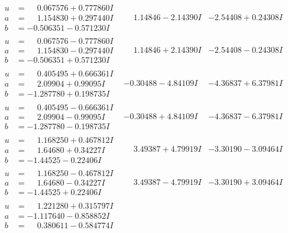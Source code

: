 \documentclass[1p]{elsarticle_modified}
\theoremstyle{definition}
\begin{document}
$$\begin{array}{c|c|c}
\begin{aligned}
u &= \phantom{-}0.067576 + 0.777860 I \\
a &= \phantom{-}1.154830 + 0.297440 I \\
b &= -0.506351 - 0.571230 I\end{aligned}
 & \phantom{-}1.14846 - 2.14390 I & -2.54408 + 0.24308 I \\ \hline\begin{aligned}
u &= \phantom{-}0.067576 - 0.777860 I \\
a &= \phantom{-}1.154830 - 0.297440 I \\
b &= -0.506351 + 0.571230 I\end{aligned}
 & \phantom{-}1.14846 + 2.14390 I & -2.54408 - 0.24308 I \\ \hline\begin{aligned}
u &= \phantom{-}0.405495 + 0.666361 I \\
a &= \phantom{-}2.09904 + 0.99095 I \\
b &= -1.287780 + 0.198735 I\end{aligned}
 & -0.30488 - 4.84109 I & -4.36837 + 6.37981 I \\ \hline\begin{aligned}
u &= \phantom{-}0.405495 - 0.666361 I \\
a &= \phantom{-}2.09904 - 0.99095 I \\
b &= -1.287780 - 0.198735 I\end{aligned}
 & -0.30488 + 4.84109 I & -4.36837 - 6.37981 I \\ \hline\begin{aligned}
u &= \phantom{-}1.168250 + 0.467812 I \\
a &= \phantom{-}1.64680 + 0.34227 I \\
b &= -1.44525 - 0.22406 I\end{aligned}
 & \phantom{-}3.49387 + 4.79919 I & -3.30190 - 3.09464 I \\ \hline\begin{aligned}
u &= \phantom{-}1.168250 - 0.467812 I \\
a &= \phantom{-}1.64680 - 0.34227 I \\
b &= -1.44525 + 0.22406 I\end{aligned}
 & \phantom{-}3.49387 - 4.79919 I & -3.30190 + 3.09464 I \\ \hline\begin{aligned}
u &= \phantom{-}1.221280 + 0.315797 I \\
a &= -1.117640 - 0.858852 I \\
b &= \phantom{-}0.380611 - 0.584774 I\end{aligned}

\end{array}$$
\end{document}
